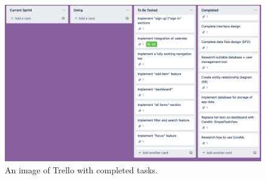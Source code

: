 \begin{figure}[H]

	\centering
	\includegraphics[width=12cm]{./graphics/trello.png}
	\caption{An image of Trello with completed tasks.}
	\label{fig:trello}
	
\end{figure}